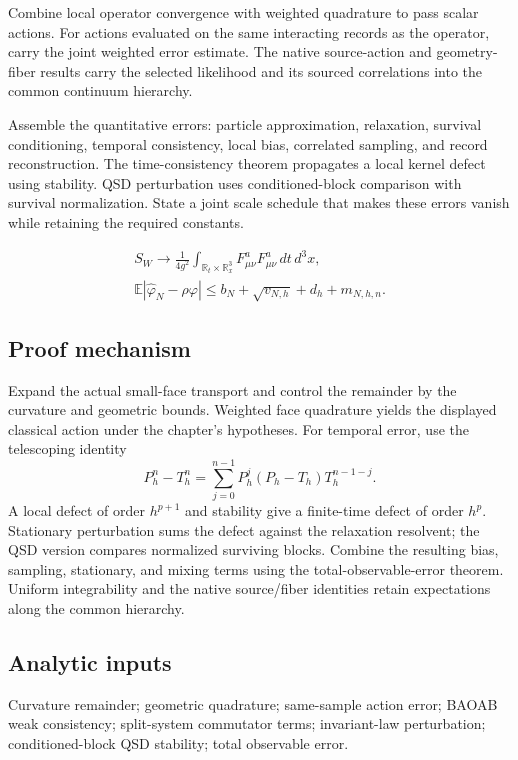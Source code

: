 \documentclass[11pt,a4paper]{article}
\begin{document}
Combine local operator convergence with weighted quadrature to pass scalar actions. For actions evaluated on the same interacting records as the operator, carry the joint weighted error estimate. The native source-action and geometry-fiber results carry the selected likelihood and its sourced correlations into the common continuum hierarchy.

Assemble the quantitative errors: particle approximation, relaxation, survival conditioning, temporal consistency, local bias, correlated sampling, and record reconstruction. The time-consistency theorem propagates a local kernel defect using stability. QSD perturbation uses conditioned-block comparison with survival normalization. State a joint scale schedule that makes these errors vanish while retaining the required constants.


\begin{gather*}
S_W\longrightarrow \frac1{4g^2}\int_{\mathbb R_t\times\mathbb R_x^3}
F_{\mu\nu}^aF_{\mu\nu}^a\,dt\,d^3x,\\
\mathbb E|\widehat\varphi_N-\rho\varphi|
\le b_N+\sqrt{v_{N,h}}+d_h+m_{N,h,n}.
\end{gather*}
\subsection*{Proof mechanism}
Expand the actual small-face transport and control the remainder by the curvature and geometric bounds. Weighted face quadrature yields the displayed classical action under the chapter's hypotheses. For temporal error, use the telescoping identity
\[P_h^n-T_h^n=\sum_{j=0}^{n-1}P_h^j(P_h-T_h)T_h^{n-1-j}.\]
A local defect of order \(h^{p+1}\) and stability give a finite-time defect of order \(h^p\). Stationary perturbation sums the defect against the relaxation resolvent; the QSD version compares normalized surviving blocks. Combine the resulting bias, sampling, stationary, and mixing terms using the total-observable-error theorem. Uniform integrability and the native source/fiber identities retain expectations along the common hierarchy.
\subsection*{Analytic inputs}
Curvature remainder; geometric quadrature; same-sample action error; BAOAB weak consistency; split-system commutator terms; invariant-law perturbation; conditioned-block QSD stability; total observable error.
\end{document}
